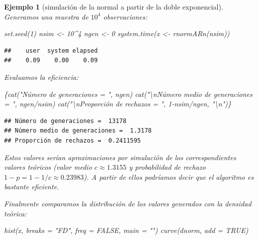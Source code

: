 \documentclass[
]{book}
\newenvironment{Shaded}{\begin{snugshade}}{\end{snugshade}}
\newcommand{\AttributeTok}[1]{\textcolor[rgb]{0.77,0.63,0.00}{#1}}
\newcommand{\ConstantTok}[1]{\textcolor[rgb]{0.00,0.00,0.00}{#1}}
\newcommand{\DecValTok}[1]{\textcolor[rgb]{0.00,0.00,0.81}{#1}}
\newcommand{\FunctionTok}[1]{\textcolor[rgb]{0.00,0.00,0.00}{#1}}
\newcommand{\NormalTok}[1]{#1}
\newcommand{\OtherTok}[1]{\textcolor[rgb]{0.56,0.35,0.01}{#1}}
\newcommand{\SpecialCharTok}[1]{\textcolor[rgb]{0.00,0.00,0.00}{#1}}
\newcommand{\StringTok}[1]{\textcolor[rgb]{0.31,0.60,0.02}{#1}}
\theoremstyle{break}
\newtheorem{example}{Ejemplo}[chapter]
\theoremstyle{nonumberplain}
\begin{document}
\begin{example}[simulación de la normal a partir de la doble exponencial]
Generamos una muestra de \(10^4\) observaciones:

\begin{Shaded}
\begin{Highlighting}[]
\FunctionTok{set.seed}\NormalTok{(}\DecValTok{1}\NormalTok{)}
\NormalTok{nsim }\OtherTok{\textless{}{-}} \DecValTok{10}\SpecialCharTok{\^{}}\DecValTok{4}
\NormalTok{ngen }\OtherTok{\textless{}{-}} \DecValTok{0}
\FunctionTok{system.time}\NormalTok{(x }\OtherTok{\textless{}{-}} \FunctionTok{rnormARn}\NormalTok{(nsim))}
\end{Highlighting}
\end{Shaded}

\begin{verbatim}
##    user  system elapsed 
##    0.09    0.00    0.09
\end{verbatim}

Evaluamos la eficiencia:

\begin{Shaded}
\begin{Highlighting}[]
\NormalTok{\{}\FunctionTok{cat}\NormalTok{(}\StringTok{"Número de generaciones = "}\NormalTok{, ngen)}
\FunctionTok{cat}\NormalTok{(}\StringTok{"}\SpecialCharTok{\textbackslash{}n}\StringTok{Número medio de generaciones = "}\NormalTok{, ngen}\SpecialCharTok{/}\NormalTok{nsim)}
\FunctionTok{cat}\NormalTok{(}\StringTok{"}\SpecialCharTok{\textbackslash{}n}\StringTok{Proporción de rechazos = "}\NormalTok{, }\DecValTok{1}\SpecialCharTok{{-}}\NormalTok{nsim}\SpecialCharTok{/}\NormalTok{ngen, }\StringTok{"}\SpecialCharTok{\textbackslash{}n}\StringTok{"}\NormalTok{)\}}
\end{Highlighting}
\end{Shaded}

\begin{verbatim}
## Número de generaciones =  13178
## Número medio de generaciones =  1.3178
## Proporción de rechazos =  0.2411595
\end{verbatim}

Estos valores serían aproximaciones por simulación de los correspondientes valores teóricos (valor medio \(c \approx 1.3155\) y probabilidad de rechazo \(1 - p = 1 - 1/c \approx 0.23983\)).
A partir de ellos podríamos decir que el algoritmo es bastante eficiente.

Finalmente comparamos la distribución de los valores generados con la densidad teórica:

\begin{Shaded}
\begin{Highlighting}[]
\FunctionTok{hist}\NormalTok{(x, }\AttributeTok{breaks =} \StringTok{"FD"}\NormalTok{, }\AttributeTok{freq =} \ConstantTok{FALSE}\NormalTok{, }\AttributeTok{main =} \StringTok{""}\NormalTok{)}
\FunctionTok{curve}\NormalTok{(dnorm, }\AttributeTok{add =} \ConstantTok{TRUE}\NormalTok{)}
\end{Highlighting}
\end{Shaded}


\end{example}
\end{document}
